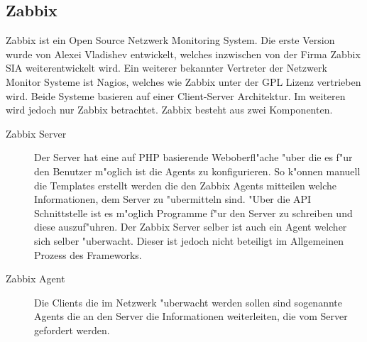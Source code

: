 \subsection{Zabbix}
Zabbix ist ein Open Source Netzwerk Monitoring System. Die erste Version wurde von Alexei Vladishev entwickelt, welches %
inzwischen von der Firma Zabbix SIA weiterentwickelt wird. %
Ein weiterer bekannter Vertreter der Netzwerk Monitor Systeme ist Nagios, welches wie Zabbix unter der GPL Lizenz vertrieben wird. %
Beide Systeme basieren auf einer Client-Server Architektur. Im weiteren wird jedoch nur Zabbix betrachtet. %
Zabbix besteht aus zwei Komponenten. %
\begin{description}
\item[Zabbix Server]Der Server hat eine auf PHP basierende Weboberfl"ache "uber die es f"ur den Benutzer m"oglich ist die Agents zu %
konfigurieren. So k"onnen manuell die Templates erstellt werden die den Zabbix Agents mitteilen welche Informationen, dem %
Server zu "ubermitteln sind. %
"Uber die API Schnittstelle ist es m"oglich Programme f"ur den Server zu schreiben und diese auszuf"uhren. %
Der Zabbix Server selber ist auch ein Agent welcher sich selber "uberwacht. Dieser ist jedoch nicht beteiligt %
im Allgemeinen Prozess des Frameworks.
\item[Zabbix Agent]Die Clients die im Netzwerk "uberwacht werden sollen sind sogenannte Agents die an den Server %
die Informationen weiterleiten, die vom Server gefordert werden. 
\end{description} 

